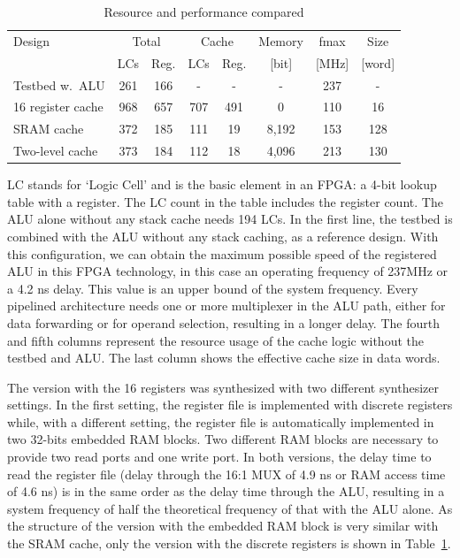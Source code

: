 \begin{table}
    \centering
    \begin{tabular}{lccccccc}
        \toprule
        Design& \multicolumn{2}{c}{Total}&
        \multicolumn{2}{c}{Cache}&
        Memory& fmax & Size\\
         & LCs& Reg.& LCs&
        Reg.& [bit]& [MHz] & [word]\\
        \midrule
        Testbed w.\ ALU& 261& 166& -& -& -&237 & - \\
        16 register cache& 968& 657& 707& 491& 0&110 & 16 \\
        SRAM cache& 372& 185& 111& 19& 8,192&153 & 128\\
        Two-level cache& 373& 184& 112& 18& 4,096& 213 & 130\\
        \bottomrule
    \end{tabular}
    \caption{Resource and performance compared}
    \label{tab_stack_resources}
\end{table}


LC stands for `Logic Cell' and is the basic element in an FPGA: a
4-bit lookup table with a register. The LC count in the table
includes the register count. The ALU alone without any stack cache
needs 194 LCs. In the first line, the testbed is combined with the
ALU without any stack caching, as a reference design. With this
configuration, we can obtain the maximum possible speed of the
registered ALU in this FPGA technology, in this case an operating
frequency of 237MHz or a 4.2 ns delay. This value is an upper bound
of the system frequency. Every pipelined architecture needs one or
more multiplexer in the ALU path, either for data forwarding or for
operand selection, resulting in a longer delay. The fourth and fifth
columns represent the resource usage of the cache logic without the
testbed and ALU. The last column shows the effective cache size in
data words.

The version with the 16 registers was synthesized with two different
synthesizer settings. In the first setting, the register file is
implemented with discrete registers while, with a different setting,
the register file is automatically implemented in two 32-bits
embedded RAM blocks. Two different RAM blocks are necessary to
provide two read ports and one write port. In both versions, the
delay time to read the register file (delay through the 16:1 MUX of
4.9 ns or RAM access time of 4.6 ns) is in the same order as the
delay time through the ALU, resulting in a system frequency of half
the theoretical frequency of that with the ALU alone. As the
structure of the version with the embedded RAM block is very similar
with the SRAM cache, only the version with the discrete registers is
shown in Table~\ref{tab_stack_resources}.

